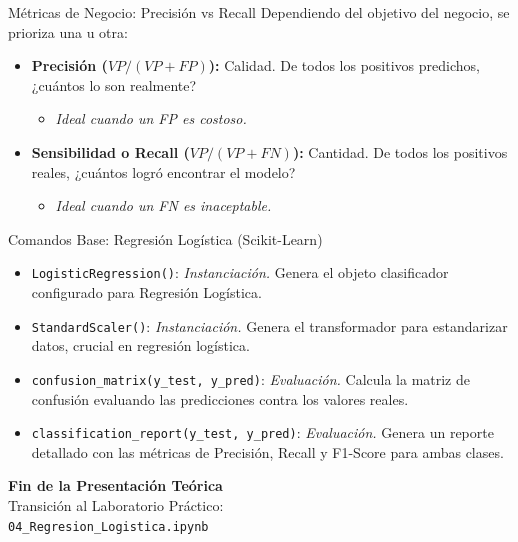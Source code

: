 \documentclass{beamer}
\begin{document}
\begin{frame}{Métricas de Negocio: Precisión vs Recall}
    Dependiendo del objetivo del negocio, se prioriza una u otra:
    \vspace{0.3cm}
    \begin{itemize}
        \item \textbf{Precisión ($VP / (VP + FP)$):} Calidad. De todos los positivos predichos, ¿cuántos lo son realmente? 
        \begin{itemize}
            \item \textit{Ideal cuando un FP es costoso.}
        \end{itemize}
        \vspace{0.2cm}
        \item \textbf{Sensibilidad o Recall ($VP / (VP + FN)$):} Cantidad. De todos los positivos reales, ¿cuántos logró encontrar el modelo? 
        \begin{itemize}
            \item \textit{Ideal cuando un FN es inaceptable.}
        \end{itemize}
    \end{itemize}
\end{frame}

\begin{frame}[fragile]{Comandos Base: Regresión Logística (Scikit-Learn)}
    \begin{itemize}
        \item \verb|LogisticRegression()|: \textit{Instanciación.} Genera el objeto clasificador configurado para Regresión Logística.
        \item \verb|StandardScaler()|: \textit{Instanciación.} Genera el transformador para estandarizar datos, crucial en regresión logística.
        \item \verb|confusion_matrix(y_test, y_pred)|: \textit{Evaluación.} Calcula la matriz de confusión evaluando las predicciones contra los valores reales.
        \item \verb|classification_report(y_test, y_pred)|: \textit{Evaluación.} Genera un reporte detallado con las métricas de Precisión, Recall y F1-Score para ambas clases.
    \end{itemize}
\end{frame}

\begin{frame}[fragile]
    \begin{center}
        \Large \textbf{Fin de la Presentación Teórica}\\
        \vspace{0.5cm}
        \normalsize Transición al Laboratorio Práctico:\\
        \vspace{0.2cm}
        \verb|04_Regresion_Logistica.ipynb|
    \end{center}
\end{frame}
\end{document}
